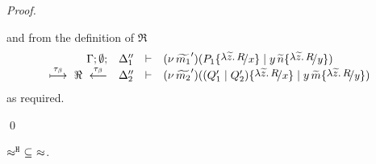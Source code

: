 \begin{proof}
\begin{enumerate}
\[%
\]
	\noi and from the definition of $\Re$
%
	\[
		\mhorel{\Gamma}{\Delta_1''}{\newsp{\widetilde{m_1}'}{P_1 \subst{\abs{\widetilde{z}}{R}}{x} \Par \appl{y}{\widetilde{n}} \subst{\abs{\widetilde{z}}{R}}{y}}}
		{\hby{\btau}\ \Re\ \stackrel{\btau}{\longleftarrow}}
		{\Delta_2''}{}{\newsp{\widetilde{m_2}'}{(Q_1' \Par Q_2') \subst{\abs{\widetilde{z}}{R}}{x} \Par \appl{y}{\widetilde{m}} \subst{\abs{\widetilde{z}}{R}}{y}}}
	\]
	\noi as required.
\end{enumerate}
	\qed
\end{proof}


\begin{lemma}
	\label{app:lem:wb_is_wbc}
	$\approx^\mathtt{H}\ \subseteq\ \approx$.
\end{lemma}

